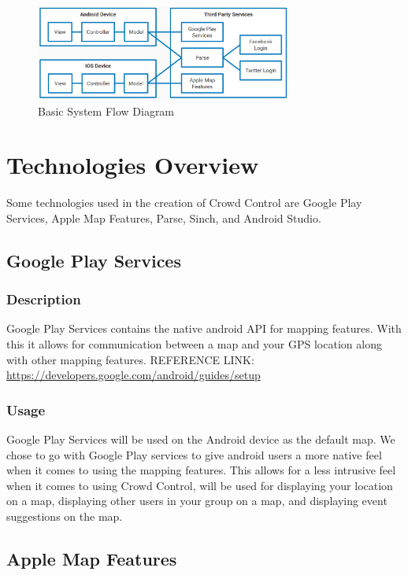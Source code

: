 \begin{figure}[tbh]
\begin{center}
\includegraphics[width=0.75\textwidth]{Additional/designpictures/ModuleFlowDiagram.png}
\end{center}
\caption{Basic System Flow Diagram \label{ModuleFlowDiagram}}
\end{figure}

\section{Technologies Overview}
Some technologies used in the creation of Crowd Control are Google Play Services, Apple Map Features, Parse, Sinch, and Android Studio.

\subsection{Google Play Services}
	\subsubsection{Description}
	Google Play Services contains the native android API for mapping features. With this it allows for communication between a map and your GPS location along with other mapping features.
\newline
REFERENCE LINK:  \url{https://developers.google.com/android/guides/setup}
	\subsubsection{Usage}
	Google Play Services will be used on the Android device as the default map. We chose to go with Google Play services to give android users a more native feel when it comes to using the mapping features. This allows for a less intrusive feel when it comes to using Crowd Control, will be used for displaying your location on a map, displaying other users in your group on a map, and displaying event suggestions on the map.

\subsection{Apple Map Features}
